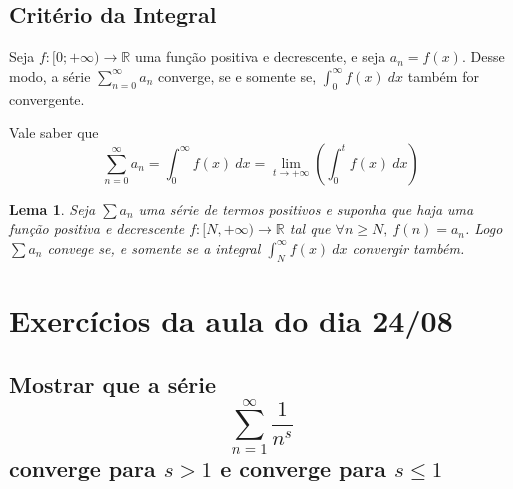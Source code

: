\documentclass[12pt,openany, letterpaper]{book}
\newtheorem{lemma}{Lema}[section]
\begin{document}
\subsection{Critério da Integral}

\hspace{5mm} Seja $\displaystyle{f: [0;+\infty) \rightarrow \mathds{R}}$ uma função positiva e decrescente, e seja $a_n = f(x)$. Desse modo, a série $\displaystyle{\sum_{n=0}^{\infty} a_n}$ converge, se e somente se, $\displaystyle{\int_0^{\infty} f(x) \ dx}$ também for convergente. 

Vale saber que $$\sum_{n=0}^{\infty} a_n = \int_0^{\infty} f(x) \ dx = \lim_{t \rightarrow +\infty} \left( \int_0^t f(x) \ dx \right)$$

\begin{lemma}
Seja $\sum a_n$ uma série de termos positivos e suponha que haja uma função positiva e decrescente $f: [N, +\infty) \rightarrow \mathds{R}$ tal que $\forall n \geq N, \ f(n) = a_n$. Logo $\sum a_n$ convege se, e somente se a integral $\displaystyle{\int_N^{\infty}  f(x) \ dx }$ convergir também.
\end{lemma}

\section{Exercícios da aula do dia 24/08}
\label{sec:211}

\subsection*{Mostrar que a série $$\sum_{n = 1}^{\infty} \frac{1}{n^s}$$ converge para $s > 1$ e converge para $s \leq 1$}
\end{document}
